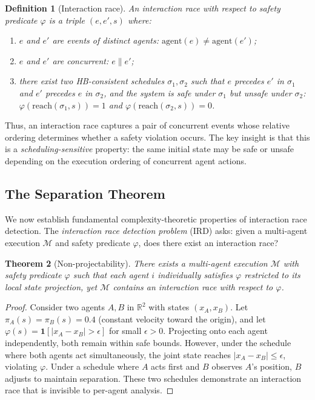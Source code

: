 \documentclass[11pt]{article}
\newtheorem{theorem}{Theorem}[section]
\newtheorem{definition}[theorem]{Definition}
\newcommand{\R}{\mathbb{R}}
\newcommand{\calM}{\mathcal{M}}
\newcommand{\conc}{\parallel}
\newcommand{\abs}[1]{\lvert #1 \rvert}
\begin{document}
\begin{definition}[Interaction race]
\label{def:race}
An \emph{interaction race} with respect to safety predicate $\varphi$ is a triple
$(e, e', s)$ where:
\begin{enumerate}[nosep,label=(\roman*)]
\item $e$ and $e'$ are events of distinct agents: $\mathrm{agent}(e) \neq \mathrm{agent}(e')$;
\item $e$ and $e'$ are concurrent: $e \conc e'$;
\item there exist two HB-consistent schedules $\sigma_1, \sigma_2$ such that
$e$ precedes $e'$ in $\sigma_1$ and $e'$ precedes $e$ in $\sigma_2$, and the
system is safe under $\sigma_1$ but unsafe under $\sigma_2$:
$\varphi(\mathrm{reach}(\sigma_1, s)) = 1$ and $\varphi(\mathrm{reach}(\sigma_2, s)) = 0$.
\end{enumerate}
\end{definition}

Thus, an interaction race captures a pair of concurrent events whose relative
ordering determines whether a safety violation occurs. The key insight is that
this is a \emph{scheduling-sensitive} property: the same initial state may be
safe or unsafe depending on the execution ordering of concurrent agent actions.

\subsection{The Separation Theorem}

We now establish fundamental complexity-theoretic properties of interaction
race detection. The \emph{interaction race detection problem} (IRD) asks:
given a multi-agent execution $\calM$ and safety predicate $\varphi$, does
there exist an interaction race?

\begin{theorem}[Non-projectability]
\label{thm:non-proj}
There exists a multi-agent execution $\calM$ with safety predicate $\varphi$
such that each agent $i$ individually satisfies $\varphi$ restricted to its
local state projection, yet $\calM$ contains an interaction race with respect
to $\varphi$.
\end{theorem}

\begin{proof}
Consider two agents $A, B$ in $\R^2$ with states $(x_A, x_B)$.
Let $\pi_A(s) = \pi_B(s) = 0.4$ (constant velocity toward the origin), and let
$\varphi(s) = \mathbf{1}[\abs{x_A - x_B} > \epsilon]$ for small $\epsilon > 0$.
Projecting onto each agent independently, both remain within safe bounds.
However, under the schedule where both agents act simultaneously, the joint
state reaches $\abs{x_A - x_B} \leq \epsilon$, violating $\varphi$.
Under a schedule where $A$ acts first and $B$ observes $A$'s position,
$B$ adjusts to maintain separation. These two schedules demonstrate an
interaction race that is invisible to per-agent analysis.
\end{proof}
\end{document}
